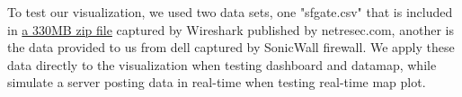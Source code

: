 To test our visualization, we used two data sets, one "sfgate.csv" that is included in \href{http://wiresharkbook.com/101_supplements/wireshark101files.zip}{a 330MB zip file} captured by Wireshark published by netresec.com, another is the data provided to us from dell captured by SonicWall firewall. We apply these data directly to the visualization when testing dashboard and datamap, while simulate a server posting data in real-time when testing real-time map plot.